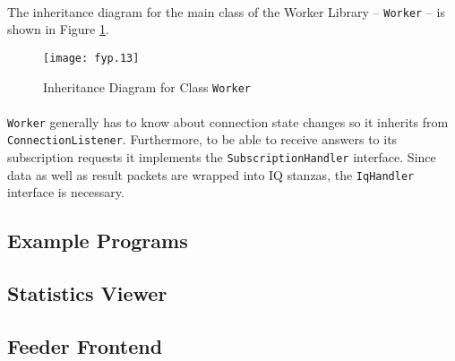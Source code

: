 \paragraph{}
The inheritance diagram for the main class of the Worker Library -- \texttt{Worker} -- is shown in Figure \ref{fig:inhworker}.

\begin{figure}[H]
\begin{center}
\texttt{[image: fyp.13]}
\end{center}
\caption{Inheritance Diagram for Class \texttt{Worker}}
\label{fig:inhworker}
\end{figure}

\paragraph{}
\texttt{Worker} generally has to know about connection state changes so it inherits from \texttt{ConnectionListener}. Furthermore, to be able to receive answers to its subscription requests it implements the \texttt{SubscriptionHandler} interface. Since data as well as result packets are wrapped into IQ stanzas, the \texttt{IqHandler} interface is necessary.


\subsection{Example Programs}
\paragraph{}

\subsection{Statistics Viewer}
\paragraph{}

\subsection{Feeder Frontend}
\paragraph{}
